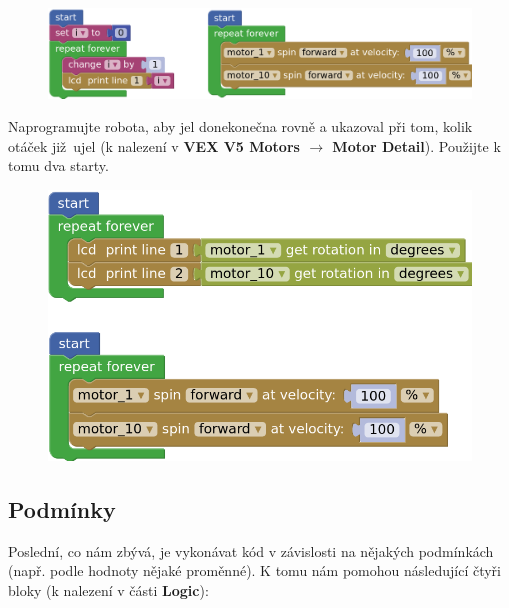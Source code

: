 \documentclass[../main.tex]{subfiles}
\begin{document}
	\begin{figure}[h!]
		\centering
		\begin{minipage}{0.8\textwidth}
			\includegraphics[width=\linewidth]{Images/05/2start.png}
		\end{minipage}
	\end{figure}

	\begin{question}
		Naprogramujte robota, aby jel donekonečna rovně a ukazoval při tom, kolik otáček již~ujel (k nalezení v \textbf{VEX V5 Motors $\rightarrow$ Motor Detail}). Použijte k tomu dva starty.
	\end{question}

	\begin{solution}
		\begin{figure}
			\centering
			\begin{minipage}{0.4\textwidth}
				\includegraphics[width=\linewidth]{Images/05/solo.png}
			\end{minipage}
		\end{figure}
	\end{solution}

	\subsection{Podmínky}\label{cha:logic}
	Poslední, co nám zbývá, je vykonávat kód v závislosti na nějakých podmínkách (např. podle hodnoty nějaké proměnné). K tomu nám pomohou následující čtyři bloky (k nalezení v části \textbf{Logic}):
	\begin{itemize}
		\blockLogicIf
		\blockLogicIfElse
		\blockLogicComparison
		\blockLogicOperator
	\end{itemize}
\end{document}
